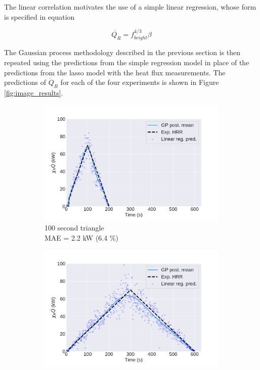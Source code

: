 \documentclass{article}
\begin{document}
The linear correlation motivates the use of a simple linear regression, whose form is specified in equation 

\begin{equation}
  \label{eqn:bright_linear_regression}
 \dot{Q_R} = f_{bright}^{4/3}\beta
\end{equation}

The Gaussian process methodology described in the previous section is then repeated using the predictions from the simple regression model in place of the predictions from the lasso model with the heat flux measurements. The predictions of $\dot{Q}_R$ for each of the four experiments is shown in Figure \ref{fig:image_results}.

\begin{figure}[htbp]
  \centering
  \begin{subfigure}[t]{.45\textwidth}
      \centering
      \includegraphics[width=\textwidth,keepaspectratio]{figures/image_result100s_triangle.pdf}
      \caption{100 second triangle \\ MAE = 2.2 kW (6.4 \%)}
      \label{fig:image_result_100s_triangle}
  \end{subfigure}
  \begin{subfigure}[t]{.45\textwidth}
      \centering
      \includegraphics[width=\textwidth ,keepaspectratio]{figures/image_result300s_triangle.pdf}

\end{subfigure}
\end{figure}
\end{document}
